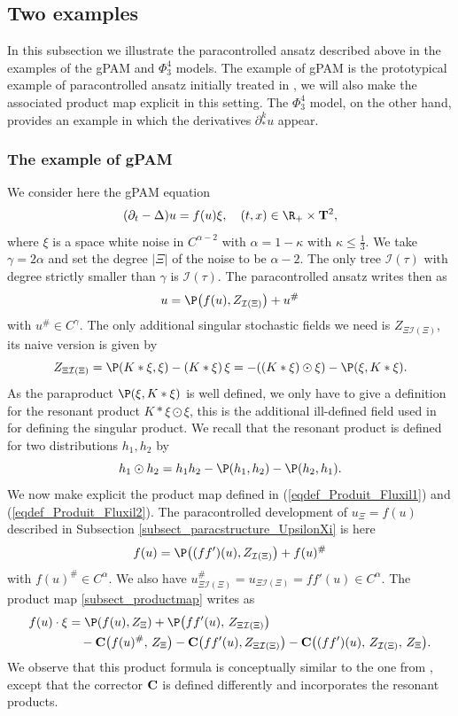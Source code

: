 \documentclass[11pt]{preprint}
\newcommand{\mcI}{\mathcal{I}}
\newcommand{\T}{\mathbf{T}}
\def\eqref#1{(\ref{#1})}
\newcommand{\bfC}{{\bf C}}
\begin{document}
	
	
	\subsection{Two examples}
	\label{examples}
	
	In this subsection we illustrate the paracontrolled ansatz described above in the examples of the gPAM and $\Phi_3^4$ models. The example of gPAM is the prototypical example of paracontrolled ansatz initially  treated in \cite{GIP}, we will also make the associated product map explicit in this setting. The $\Phi_3^4$ model, on the other hand, provides an example in which the derivatives $\partial_*^k u$ appear.
	
	\subsubsection{The example of gPAM}
	
	We consider here the gPAM equation 
	$$
	(\partial_t-\Delta)u=f(u)\xi, \quad (t,x) \in \R_+ \times \T^2, 
	$$
	where $\xi$ is a space white noise in $C^{\alpha-2}$ with $\alpha = 1 - \kappa$ with $\kappa \leq \frac{1}{3}$. We take $\gamma=2\alpha$ and set the degree $|\Xi|$ of the noise to be $\alpha-2$. The only tree $\mcI(\tau)$ with degree strictly smaller than $\gamma$ is $\mcI(\tau)$. The paracontrolled ansatz writes then as
	$$
	u=\P\big(f(u),Z_{\mcI(\Xi)}\big) + u^\#
	$$ 
	with $u^\#\in C^\gamma$. The only additional singular stochastic fields we need is $Z_{\Xi\mcI(\Xi)}$, its naive version is given by 
	$$
	Z_{\Xi\mcI(\Xi)} = \P(K*\xi,\xi) - (K*\xi) \, \xi = - ((K*\xi) \odot \xi) - \P(\xi, K*\xi). $$
	As the paraproduct $\P(\xi, K*\xi)$ is well defined, we only have to give a definition for the resonant product $ K*\xi \odot \xi$, this is the additional ill-defined field used in \cite{GIP} for defining the singular product. We recall that the resonant product is defined for two distributions $ h_1, h_2 $ by 
	\begin{equation*}
		h_1 \odot h_2 = h_1 h_2 - \P(h_1,h_2) -  \P(h_2,h_1).
	\end{equation*}
	We now make explicit the product map defined in \eqref{eqdef_Produit_Fluxil1} and \eqref{eqdef_Produit_Fluxil2}. The paracontrolled development of $u_\Xi=f(u)$ described in Subsection \ref{subsect_paracstructure_UpsilonXi} is here
	$$
	f(u) = \P\big((ff')(u) , Z_{\mcI(\Xi)}\big)  +  f(u)^\#
	$$
	with $f(u)^\#\in C^\alpha$. We also have $u_{\Xi\mcI(\Xi)}^\# =u_{\Xi\mcI(\Xi)} = ff'(u)\in C^\alpha$. The product map \ref{subsect_productmap} writes as 
	 \begin{align*}
	 	f(u)\cdot\xi &=\P(f(u),Z_\Xi) +  \P\big(ff'(u),\,  Z_{\Xi\mcI(\Xi)}  \big)  \\&\quad -  \bfC\big( f(u)^\#,\, Z_\Xi \big)  -\bfC\big(ff'(u), Z_{\Xi\mcI(\Xi)}\big) -   \bfC\big( (ff')(u) , \, Z_{\mcI(\Xi)}, \, Z_{\Xi}   \big).
	 \end{align*}
	 We observe that this product formula is conceptually similar to the one from \cite{GIP}, except that the corrector $\bfC$ is defined differently and incorporates the resonant products.
	 
\end{document}
